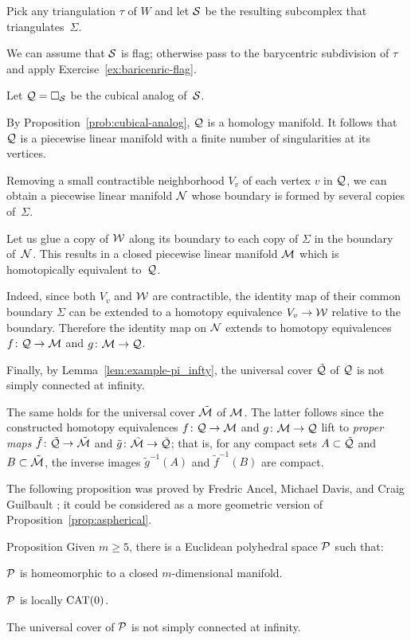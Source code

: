 Pick any triangulation $\tau$ of $W$ and let $\mathcal{S}$ be the resulting subcomplex that triangulates~$\Sigma$.


We can assume that $\mathcal{S}$ is flag; 
otherwise pass to the barycentric subdivision 
of $\tau$ and apply Exercise~\ref{ex:baricenric-flag}.


Let $\mathcal{Q}=\square_{\mathcal{S}}$ be the cubical analog of~$\mathcal{S}$.

By Proposition~\ref{prob:cubical-analog},
$\mathcal{Q}$ is a homology manifold.
It follows that $\mathcal{Q}$ is a piecewise linear manifold 
with a finite number of singularities at its vertices.


Removing a small contractible neighborhood $V_v$ of each vertex $v$ in $\mathcal{Q}$,
we can obtain a piecewise linear manifold $\mathcal{N}$
whose boundary is formed by several copies of~$\Sigma$.

Let us glue a copy of  $\mathcal{W}$ along its boundary to each copy of $\Sigma$ in the boundary of~$\mathcal{N}$.
This results in a  closed piecewise linear manifold 
$\mathcal{M}$ which is homotopically equivalent to~$\mathcal{Q}$.

Indeed, since both $V_v$ and $\mathcal{W}$ are contractible, the identity map of  their common boundary $\Sigma$ can be extended to a homotopy equivalence $V_v\to\mathcal{W}$ relative to the boundary.
Therefore the identity map on $\mathcal{N}$ extends to homotopy equivalences 
$f\colon \mathcal{Q}\to \mathcal{M}$ and $g\colon\mathcal{M}\to \mathcal{Q}$.

Finally, by Lemma~\ref{lem:example-pi_infty},  
the universal cover $\tilde{\mathcal{Q}}$ of $\mathcal{Q}$
is not simply connected at infinity.

The same holds for 
the universal cover $\tilde{\mathcal{M}}$ of $\mathcal{M}$.
The latter follows since the constructed homotopy equivalences 
$f\colon \mathcal{Q}\to \mathcal{M}$ and $g\:\spc M\z\to \spc Q$ 
lift to {}\emph{proper maps} 
$\tilde f \colon \tilde{\mathcal{Q}}\to \tilde{\mathcal{M}}$
and $\tilde g \colon \tilde{\mathcal{M}}\to \tilde{\mathcal{Q}}$;
that is, for any compact sets $A\subset \tilde{\mathcal{Q}}$ and $B\subset\tilde{\mathcal{M}}$, the inverse images $\tilde g^{-1}(A)$ and $\tilde f^{-1}(B)$ are compact.
\qeds


The following proposition was proved by
Fredric Ancel, 
Michael Davis,
and Craig Guilbault \cite{ancel-davis-guilbault};
it could be considered as a more geometric version of Proposition~\ref{prop:aspherical}.


\begin{thm}{Proposition}\label{prop:loc-CAT-mnfld}
Given $m\ge 5$, there is a Euclidean polyhedral space $\mathcal{P}$ such that:
\begin{subthm}{}
$\mathcal{P}$ is homeomorphic to a closed $m$-dimensional manifold.
\end{subthm}

\begin{subthm}{}
$\mathcal{P}$ is locally $\mathrm{CAT}(0)$.
\end{subthm}

\begin{subthm}{}
The universal cover of $\mathcal{P}$ is not simply connected at infinity.
\end{subthm}
\end{thm}


